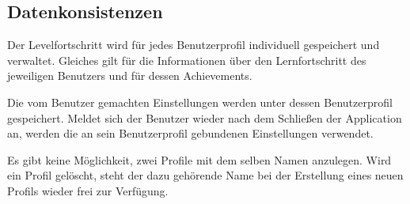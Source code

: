 \subsection{Datenkonsistenzen}

\begin{requirements}
  		
  	 Der Levelfortschritt wird für jedes Benutzerprofil individuell gespeichert und verwaltet. Gleiches gilt für die Informationen über den Lernfortschritt des jeweiligen Benutzers und für dessen Achievements.
  		
	 Die vom Benutzer gemachten Einstellungen werden unter dessen Benutzerprofil gespeichert. Meldet sich der Benutzer wieder nach dem Schließen der Application an, werden die an sein Benutzerprofil gebundenen Einstellungen verwendet.
	
	 Es gibt keine Möglichkeit, zwei Profile mit dem selben Namen anzulegen. Wird ein Profil gelöscht, steht der dazu gehörende Name bei der Erstellung eines neuen Profils wieder frei zur Verfügung.

\end{requirements}		
  			
  		
